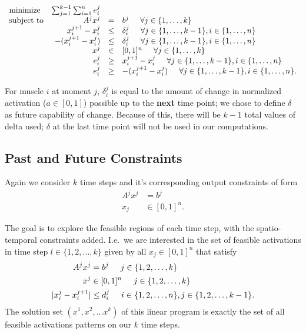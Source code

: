 \begin{equation}
\begin{array}{lrcl}
\mbox{minimize} & \sum_{j=1}^{k-1} \sum_{i=1}^n e_i^j \\ 
\mbox{subject to} & A^j x^j &=& b^j \hspace{5mm} \forall j \in \{1,\dots, k\} \\
  & x_i^{j+1} - x_i^{j} &\leq& \delta_i^j  \hspace{5mm} \forall j \in \{1,\dots, k-1\}, i \in \{1,\dots,n\} \\
  &  -(x_i^{j+1} - x_i^{j}) &\leq& \delta_i^j  \hspace{5mm} \forall j \in \{1,\dots, k-1\}, i \in \{1,\dots,n\} \\
  & x^j &\in& [0,1]^n \hspace{5mm} \forall j \in \{1,\dots, k\} \\
  & e_i^j &\geq& x_i^{j+1} - x_i^{j} \hspace{5mm} \forall j \in \{1,\dots, k-1\}, i \in \{1,\dots,n\}\\
  & e_i^j &\geq& -(x_i^{j+1} - x_i^{j}) \hspace{5mm} \forall j \in \{1,\dots, k-1\}, i \in \{1,\dots,n\}.
\end{array}
\end{equation}

For muscle $i$ at moment $j$, $\delta_i^j$ is equal to the amount of change in normalized activation ($a \in [0,1]$) possible up to the \textbf{next} time point; we chose to define $\delta$ as future capability of change. Because of this, there will be $k-1$ total values of delta used; $\delta$ at the last time point will not be used in our computations.

\subsection{Past and Future Constraints}
Again we consider $k$ time steps and it's corresponding output constraints of form
\begin{align}
A^j x^j &= b^j \nonumber \\
x_j &\in [0,1]^n. \label{ls_nospatio}
\end{align}

The goal is to explore the feasible regions of each time step, with the spatio-temporal constraints added. I.e.\ we are interested in the set of feasible activations in time step $l \in \{1,2,\dots,k\}$ given by all $x_j \in [0,1]^n$ that satisfy
\begin{align}
A^jx^j &= b^j \hspace{5mm} j \in \{1,2,\dots, k\}  \nonumber \\
x^j &\in [0,1]^n \hspace{5mm}  j \in \{1,2,\dots, k\} \nonumber \\
|x_i^j - x_i^{j+1}| &\leq d_i^j \hspace{5mm} i \in \{1,2,\dots,n\}, j \in \{1,2,\dots, k-1\}.  \label{ls_spatio}
\end{align}
The solution set $(x^1,x^2, \dots x^k)$ of this linear program is exactly the set of all feasible activations patterns on our $k$ time steps. 

